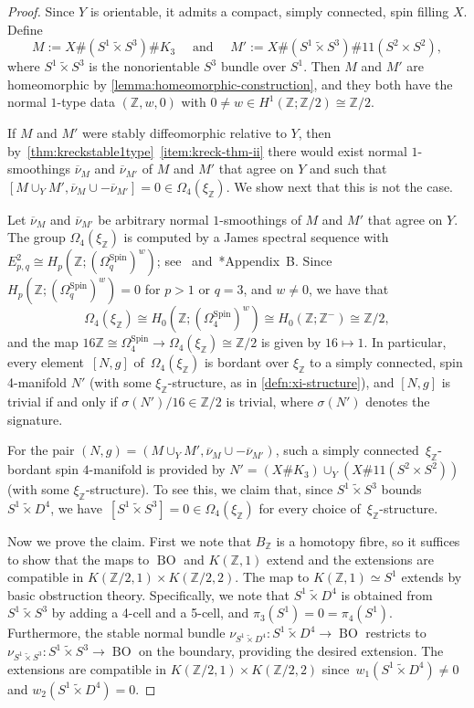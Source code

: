 \documentclass[a4paper, reqno]{amsart}
\theoremstyle{definition}
\theoremstyle{remark}
\newcommand{\Z}{\mathbb{Z}}
\newcommand{\spin}{\mathrm{Spin}}
\newcommand{\Spin}{\mathrm{Spin}}
\newcommand{\ol}{\overline}
\newcommand{\wt}{\widetilde}
\DeclareMathOperator{\BO}{BO}
\begin{document}
\begin{proof}
Since $Y$ is orientable, it admits a compact, simply connected, spin filling $X$.
Define 
\[M := X \# (S^1 \wt{\times} S^3) \# K_3 \quad\text{ and }\quad M' := X \# (S^1 \wt{\times} S^3) \# 11(S^2 \times S^2),\] 
where $S^1 \wt{\times} S^3$ is the nonorientable $S^3$ bundle over $S^1$. 
Then $M$ and $M'$ are homeomorphic by \cref{lemma:homeomorphic-construction}, and they both have the normal $1$-type data $(\Z,w,0)$ with $0\neq w\in H^1(\Z;\Z/2) \cong \Z/2$. 

If $M$ and $M'$ were stably diffeomorphic relative to $Y$, then by~\cref{thm:kreckstable1type}~\eqref{item:kreck-thm-ii} there would exist normal $1$-smoothings $\ol{\nu}_M$ and $\ol{\nu}_{M'}$ of $M$ and $M'$ that agree on $Y$ and such that $
[M\cup_Y M', \ol{\nu}_M \cup - \ol{\nu}_{M'}] = 0\in \Omega_4(\xi_\Z)$. We show next that this is not the case. 

Let $\overline{\nu}_M$ and $\overline{\nu}_{M'}$ be arbitrary normal $1$-smoothings of $M$ and $M'$ that agree on $Y$. 
The group $\Omega_4(\xi_\Z)$ is computed by a James spectral sequence with $E^2_{p,q} \cong H_p(\Z;(\Omega_q^{\Spin})^w)$; see~\cite{teichnerthesis} and~\cite{GTV-xi-fillings}*{Appendix~B}.   
Since $H_p(\Z;(\Omega_q^{\Spin})^w)=0$ for $p>1$ or $q=3$, and $w\neq 0$,
we have that 
\[\Omega_4(\xi_\Z) \cong H_0(\Z;(\Omega_4^{\Spin})^w) \cong H_0(\Z;\Z^-)\cong \Z/2,\]
and the map $16\Z\cong \Omega_4^\spin\to \Omega_4(\xi_\Z)\cong \Z/2$ is given by $16\mapsto 1$. In particular, every element~$[N,g]$ of~$\Omega_4(\xi_\Z)$ is bordant over $\xi_\Z$ to a simply connected, spin 4-manifold $N'$ (with some $\xi_\Z$-structure, as in \cref{defn:xi-structure}), and $[N,g]$ is trivial if and only if  $\sigma(N')/16\in \Z/2$ is trivial, where $\sigma(N')$ denotes the signature. 

For the pair
$(N,g)=(M\cup_Y M', \ol{\nu}_M \cup - \ol{\nu}_{M'})$, such a simply connected~$\xi_\Z$-bordant spin $4$-manifold is provided by $N'=(X\#K_3)\cup_Y (X\#11(S^2\times S^2))$  (with some $\xi_\Z$-structure). To see this, we claim that, since $S^1\wt\times S^3$ bounds $S^1\wt \times D^4$, we have~$[S^1\wt\times S^3]=0\in \Omega_4(\xi_\Z)$ for every choice of~$\xi_{\Z}$-structure. 

Now we prove the claim. First we note that $B_\Z$ is a homotopy fibre, so it suffices to show that the maps to $\BO$ and $K(\Z,1)$ extend and the extensions are compatible in $K(\Z/2,1) \times K(\Z/2,2)$. The map to $K(\Z,1) \simeq S^1$ extends by basic obstruction theory. Specifically, we note that $S^1 \wt{\times} D^4$ is obtained from $S^1 \wt{\times} S^3$ by adding a  4-cell and a 5-cell, and $\pi_3(S^1) = 0 = \pi_4(S^1)$.
Furthermore, the stable normal bundle $\nu_{S^1\wt{\times}D^4}\colon S^1\wt{\times}D^4\to \BO$ restricts to $\nu_{S^1\wt{\times}S^3}\colon S^1\wt{\times}S^3\to \BO$ on the boundary, providing the desired extension.  
The extensions are compatible in $K(\Z/2,1) \times K(\Z/2,2)$ since~$w_1(S^1 \wt{\times} D^4) \neq 0$ and $w_2(S^1 \wt{\times} D^4)=0$.


\end{proof}
\end{document}
